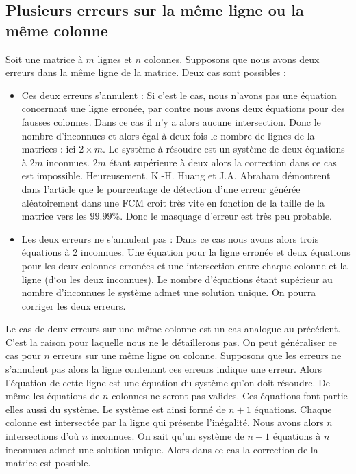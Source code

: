 \documentclass[a4paper, 10pt]{report}
\begin{document}
\subsection{Plusieurs erreurs sur la même ligne ou la même colonne}
Soit une matrice à $m$ lignes et $n$ colonnes. Supposons que nous avons deux erreurs dans la même ligne de la matrice. 
Deux cas sont possibles :
\begin{itemize}
 \item Ces deux erreurs s’annulent : Si c’est le cas, nous n’avons pas une équation concernant une ligne erronée, par 
       contre nous avons deux équations pour des fausses colonnes. Dans ce cas il n’y a alors aucune intersection. 
       Donc le nombre d’inconnues et alors égal à deux fois le nombre de lignes de la matrices : ici $2 \times m$.
       \newline
       Le système à résoudre est un système de deux équations à $2m$ inconnues. $2m$ étant supérieure à deux alors 
       la correction dans ce cas est impossible.\newline
       Heureusement, K.-H. Huang et J.A. Abraham démontrent dans l'article que le pourcentage de détection d'une erreur 
       générée  aléatoirement dans une FCM croit très vite en fonction de la taille de la matrice vers les $99.99\%$. 
       Donc le masquage d'erreur est très peu probable.  
 \item Les deux erreurs ne s’annulent pas : Dans ce cas nous avons alors trois équations à 2 inconnues. Une équation 
       pour la ligne erronée et deux équations pour les deux colonnes erronées et une intersection entre chaque colonne 
       et la ligne (d‘ou les deux inconnues). Le nombre d’équations étant supérieur au nombre d’inconnues le système admet 
       une solution unique. On pourra corriger les deux erreurs.
\end{itemize}
Le cas de deux erreurs sur une même colonne est un cas analogue au précédent. C’est la raison pour laquelle nous ne 
le détaillerons pas.\newline
On peut généraliser ce cas pour $n$ erreurs sur une même ligne ou colonne. Supposons que les erreurs ne s’annulent pas 
alors la ligne contenant ces erreurs indique une erreur. Alors l’équation de cette ligne est une équation du système 
qu’on doit résoudre. De même les équations de $n$ colonnes ne seront pas valides. Ces équations font partie elles aussi 
du système. Le système est ainsi formé de $n+1$ équations. Chaque colonne est intersectée par la ligne qui présente l’inégalité. 
Nous avons alors $n$ intersections d’où $n$ inconnues.\newline
On sait qu'un système de $n+1$ équations à $n$ inconnues admet une solution unique. Alors dans ce cas la correction de 
la matrice est possible.
\end{document}
